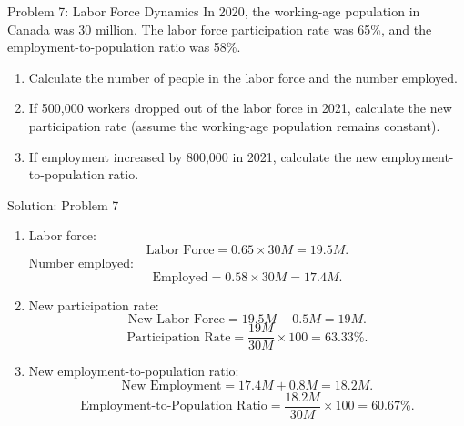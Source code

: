 \documentclass{beamer}
\begin{document}
\begin{frame}{Problem 7: Labor Force Dynamics}
In 2020, the working-age population in Canada was 30 million. The labor force participation rate was 65\%, and the employment-to-population ratio was 58\%.

\begin{enumerate}
    \item Calculate the number of people in the labor force and the number employed.
    \item If 500,000 workers dropped out of the labor force in 2021, calculate the new participation rate (assume the working-age population remains constant).
    \item If employment increased by 800,000 in 2021, calculate the new employment-to-population ratio.
\end{enumerate}
\end{frame}

\begin{frame}{Solution: Problem 7}
\begin{enumerate}
    \item Labor force:
    \[
    \text{Labor Force} = 0.65 \times 30M = 19.5M.
    \]
    Number employed:
    \[
    \text{Employed} = 0.58 \times 30M = 17.4M.
    \]
    \item New participation rate:
    \[
    \text{New Labor Force} = 19.5M - 0.5M = 19M.
    \]
    \[
    \text{Participation Rate} = \frac{19M}{30M} \times 100 = 63.33\%.
    \]
    \item New employment-to-population ratio:
    \[
    \text{New Employment} = 17.4M + 0.8M = 18.2M.
    \]
    \[
    \text{Employment-to-Population Ratio} = \frac{18.2M}{30M} \times 100 = 60.67\%.
    \]
\end{enumerate}
\end{frame}
\end{document}
